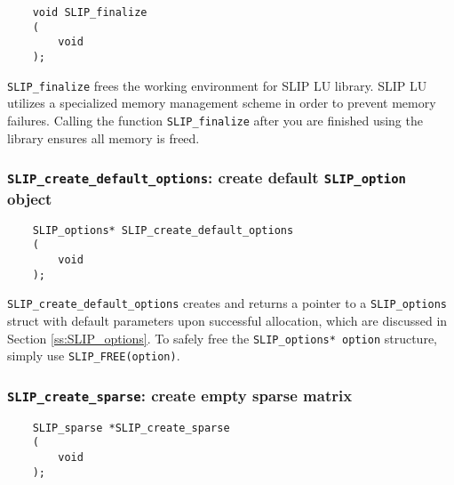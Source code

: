 \documentclass[12pt]{article}
\theoremstyle{definition}
\begin{document}
\begin{mdframed}[userdefinedwidth=6in]
{\footnotesize
\begin{verbatim}
    void SLIP_finalize
    (
        void
    );
\end{verbatim}
} \end{mdframed}

\verb|SLIP_finalize| frees the working environment for SLIP LU library. SLIP LU
utilizes a specialized memory management scheme in order to prevent memory
failures. Calling the function \verb|SLIP_finalize| after you are finished
using the library ensures all memory is freed.

\cprotect\subsubsection{\verb|SLIP_create_default_options|: create default \verb|SLIP_option| object}
\label{ss:create_default_options}

\begin{mdframed}[userdefinedwidth=6in]
{\footnotesize
\begin{verbatim}
    SLIP_options* SLIP_create_default_options
    (
        void
    );
\end{verbatim}
} \end{mdframed}

\verb|SLIP_create_default_options| creates and returns a pointer to a
\verb|SLIP_options| struct with default parameters upon successful allocation,
which are discussed in Section \ref{ss:SLIP_options}.  To safely free the
\verb|SLIP_options* option| structure, simply use \verb|SLIP_FREE(option)|.

\cprotect\subsubsection{\verb|SLIP_create_sparse|: create empty sparse matrix}
\label{ss:create_sparse}

\begin{mdframed}[userdefinedwidth=6in]
{\footnotesize
\begin{verbatim}
    SLIP_sparse *SLIP_create_sparse
    (
        void
    );
\end{verbatim}
} \end{mdframed}
\end{document}
